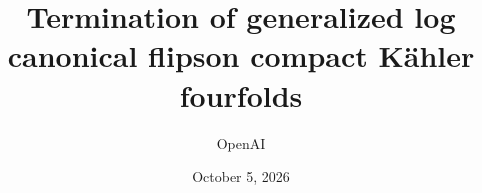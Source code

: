 \documentclass[11pt]{amsart}
\title[Generalized log canonical flips on K\"ahler fourfolds]{Termination of generalized log canonical flips\newline on compact K\"ahler fourfolds}
\author{OpenAI}
\date{October 5, 2026}
\theoremstyle{definition}
\theoremstyle{remark}
\numberwithin{equation}{section}
\begin{document}
\begin{abstract}

\end{abstract}
\maketitle
\tableofcontents










\end{document}
